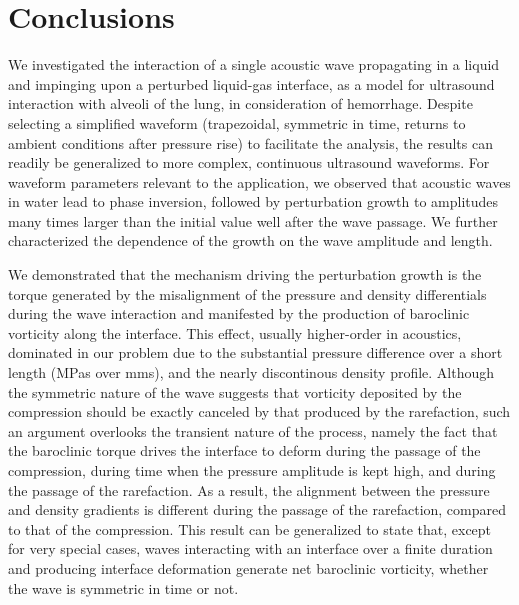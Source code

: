 %
\section{Conclusions}
\label{sec:conclusions}

We investigated the interaction of a single acoustic wave propagating
in a liquid and impinging upon a perturbed liquid-gas interface, as a
model for ultrasound interaction with alveoli of the lung, in
consideration of hemorrhage.  Despite selecting a simplified waveform
(trapezoidal, symmetric in time, returns to ambient conditions after
pressure rise) to facilitate the analysis, the results can readily be
generalized to more complex, continuous ultrasound waveforms.  For
waveform parameters relevant to the application, we observed that
acoustic waves in water lead to phase inversion, followed by
perturbation growth to amplitudes many times larger than the initial
value well after the wave passage. We further characterized the
dependence of the growth on the wave amplitude and length.

We demonstrated that the mechanism driving the perturbation growth is
the torque generated by the misalignment of the pressure and density
differentials during the wave interaction and manifested by the
production of baroclinic vorticity along the interface.  This effect,
usually higher-order in acoustics, dominated in our problem due to the
substantial pressure difference over a short length (MPas over mms),
and the nearly discontinous density profile. Although the symmetric
nature of the wave suggests that vorticity deposited by the
compression should be exactly canceled by that produced by the
rarefaction, such an argument overlooks the transient nature of the
process, namely the fact that the baroclinic torque drives the
interface to deform during the passage of the compression, during time
when the pressure amplitude is kept high, and during the passage of
the rarefaction. As a result, the alignment between the pressure and
density gradients is different during the passage of the rarefaction,
compared to that of the compression. This result can be generalized to
state that, except for very special cases, waves interacting with an
interface over a finite duration and producing interface deformation
generate net baroclinic vorticity, whether the wave is symmetric in
time or not.

